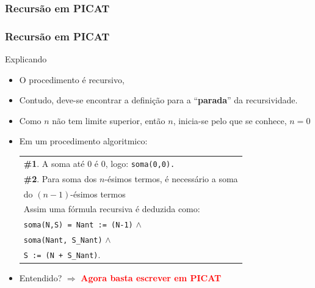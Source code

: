 \documentclass[10pt]{beamer}
\begin{document}
\begin{frame}%
 \frametitle{Recursão em PICAT}


\end{frame}



\begin{frame}%
 \frametitle{Recursão em PICAT}

\begin{block}{Explicando}
\begin{itemize}
  \item O procedimento é recursivo, 

\item Contudo, deve-se encontrar a definição para 
a ``\textbf{parada}'' da recursividade. 

\item Como $n$ não tem limite superior,
então $n$, inicia-se pelo que se conhece, $n=0$

\pause
\item Em um procedimento algoritmico:\\

{\small
\begin{center}
\begin{tabular}[c]{p{8cm}}\hline \hline
\textbf{\#1}. A soma até 0 \'{e} 0, logo: \texttt{soma(0,0).}\\
\textbf{\#2}. Para soma dos $n$-\'{e}simos termos,
 \'{e} necess\'{a}rio a soma \\
do $(n-1)$-\'{e}simos termos\\
Assim uma fórmula recursiva é deduzida como:\\
\texttt{soma(N,S) = Nant := (N-1)} $\wedge$\\ 
\texttt{soma(Nant, S\_Nant)}   $\wedge$ \\
 \texttt{S := (N + S\_Nant)}.\\ 
 \hline \hline
\end{tabular}
\end{center}
}
\pause
\item Entendido?
\pause
$\Rightarrow $ \textbf{\textcolor{red}{Agora basta escrever em PICAT}}

\end{itemize}


\end{block}

\end{frame}
\end{document}
